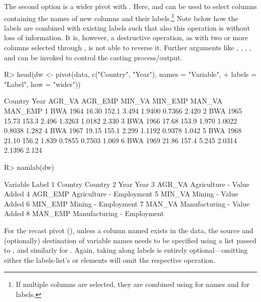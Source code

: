 \documentclass[article]{jss} %
\newcommand{\fct}[1]{\code{#1()}}
\begin{document}
The second option is a wider pivot with . Here,  and  can be used to select columns containing the names of new columns and their labels.\footnote{If multiple columns are selected, they are combined using  for names and  for labels. \vspace{-5mm}} Note below how the labels are combined with existing labels such that also this operation is without loss of information. It is, however, a destructive operation, as with two or more columns selected through , \fct{pivot} is not able to reverse it. Further arguments like , , , , and  can be invoked to control the casting process/output.
%
\begin{Schunk}
\begin{Sinput}
R> head(dw <- pivot(data, c("Country", "Year"), names = "Variable",
+    labels = "Label", how = "wider"))
\end{Sinput}
\begin{Soutput}
  Country Year AGR_VA AGR_EMP MIN_VA MIN_EMP MAN_VA MAN_EMP
1     BWA 1964  16.30   152.1  3.494  1.9400 0.7366   2.420
2     BWA 1965  15.73   153.3  2.496  1.3263 1.0182   2.330
3     BWA 1966  17.68   153.9  1.970  1.0022 0.8038   1.282
4     BWA 1967  19.15   155.1  2.299  1.1192 0.9378   1.042
5     BWA 1968  21.10   156.2  1.839  0.7855 0.7503   1.069
6     BWA 1969  21.86   157.4  5.245  2.0314 2.1396   2.124
\end{Soutput}
\begin{Sinput}
R> namlab(dw)
\end{Sinput}
\begin{Soutput}
  Variable                       Label
1  Country                     Country
2     Year                        Year
3   AGR_VA   Agriculture - Value Added
4  AGR_EMP    Agriculture - Employment
5   MIN_VA        Mining - Value Added
6  MIN_EMP         Mining - Employment
7   MAN_VA Manufacturing - Value Added
8  MAN_EMP  Manufacturing - Employment
\end{Soutput}
\end{Schunk}
%
For the recast pivot (), unless a column named  exists in the data, the source and (optionally) destination of variable names needs to be specified using a list passed to , and similarly for . Again, taking along labels is entirely optional---omitting either the labels-list's  or  elements will omit the respective operation.
\end{document}
